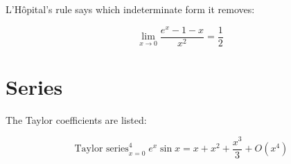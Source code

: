\documentclass[11pt,a4paper]{article}
\theoremstyle{plain}
\theoremstyle{definition}
\theoremstyle{remark}
\begin{document}
L'H\^{o}pital's rule says which indeterminate form it removes:

\begin{equation*}
  \lim_{x \to 0} \frac{e^x - 1 - x}{x^2} = \frac{1}{2}
\end{equation*}
\section*{Series}

The Taylor coefficients are listed:

\begin{equation*}
  \operatorname{Taylor\ series}_{x=0}^{4} e^x \sin x = x + x^{2} + \frac{x^{3}}{3} + O\left(x^{4}\right)
\end{equation*}
\end{document}
